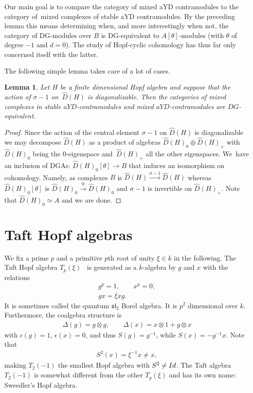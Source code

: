 \documentclass[11pt]{article}
\numberwithin{equation}{section}
\numberwithin{equation}{section}
\newtheorem{Lemma}[Theorem]{Lemma}
\newcommand{\ot}{\otimes}
\begin{document}
Our main goal is to compare the category of mixed
aYD contramodules to the category of~mixed complexes of stable aYD
contramodules. By the preceding lemma this means determining when,
and more interestingly when not, the category of DG-modules over $B$ is DG-equivalent to $A[\theta]$-modules (with $\theta$ of degree $-1$ and $d=0$). The study of Hopf-cyclic cohomology has thus far only concerned itself with the latter.

The following simple lemma takes care of a lot of cases.

\begin{Lemma}\label{diag}
Let $H$ be a finite dimensional Hopf algebra and suppose that the action of $\sigma-1$ on~$\widehat{D}(H)$ is diagonalizable. Then the categories of mixed complexes in stable $aYD$-contramodules and mixed $aYD$-contramodules are $DG$-equivalent.
\end{Lemma}

\begin{proof}
Since the action of the central element $\sigma-1$ on $\widehat{D}(H)$ is diagonalizable we may decom\-pose $\widehat{D}(H)$ as a product of algebras $\widehat{D}(H)_0\oplus \widehat{D}(H)_+$ with $\widehat{D}(H)_0$ being the $0$-eigenspace and~$\widehat{D}(H)_+$ all the other eigenspaces. We~have an inclusion of DGAs: $\widehat{D}(H)_0[\theta]\to B$ that induces an isomorphism on cohomology. Namely, as complexes $B$ is $\widehat{D}(H)\stackrel{\sigma-1}{\to}\widehat{D}(H)$ whereas $\widehat{D}(H)_0[\theta]$ is $\widehat{D}(H)_0\stackrel{0}{\to}\widehat{D}(H)_0$ and $\sigma-1$ is invertible on $\widehat{D}(H)_+$. Note that $\widehat{D}(H)_0\simeq A$ and we are done.
\end{proof}



\section{Taft Hopf algebras}\label{sec:blah}
We fix a prime $p$ and a primitive $p$th root of unity $\xi\in k$ in the following. The Taft Hopf algebra $T_p(\xi)$~\cite{taft} is generated as a $k$-algebra by $g$ and $x$ with the relations \begin{gather}
g^p=1,\qquad
x^p=0,
\\
gx=\xi xg.
\end{gather}
It is sometimes called the quantum ${\mathfrak{sl}}_2$ Borel algebra. It is $p^2$ dimensional over $k$. Furthermore, the coalgebra structure is
\begin{gather}
\Delta(g)=g\ot g,\qquad \Delta(x)=x\ot 1+g\ot x
\end{gather}
with $\epsilon(g)=1$, $\epsilon(x)=0$, and thus $S(g)=g^{-1}$, while $S(x)=-g^{-1}x$. Note that
\begin{gather}
S^2(x)=\xi^{-1}x\neq x,
\end{gather}
making $T_2(-1)$ the smallest Hopf algebra with $S^2\neq {\rm Id}$. The Taft algebra $T_2(-1)$ is somewhat different from the other $T_p(\xi)$ and has its own name: Sweedler’s Hopf algebra.
\end{document}
